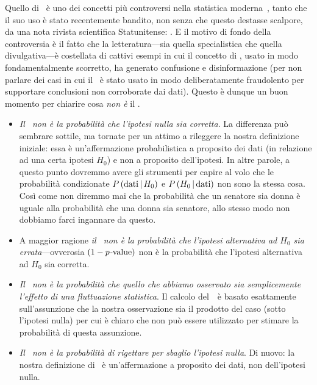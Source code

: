 Quello di \pvalue\ è uno dei concetti più controversi nella statistica
moderna~\cite{dagostini_pvalues,asa_pvalues}, tanto che il suo uso è stato
recentemente bandito, non senza che questo destasse scalpore, da una nota
rivista scientifica Statunitense: .
E il motivo di fondo della controversia è il fatto che la letteratura---sia
quella specialistica che quella divulgativa---è costellata di cattivi esempi
in cui il concetto di \pvalue, usato in modo fondamentalmente scorretto, ha
generato confusione e disinformazione (per non parlare dei casi in cui il
\pvalue\ è stato usato in modo deliberatamente fraudolento per supportare
conclusioni non corroborate dai dati). Questo è dunque un buon momento per
chiarire cosa \emph{non è} il \pvalue.

\begin{itemize}
\item \emph{Il \pvalue\ non è la probabilità che l'ipotesi nulla sia
  corretta}. La differenza può sembrare sottile, ma tornate per un attimo a
  rileggere la nostra definizione iniziale: essa è un'affermazione
  probabilistica a proposito dei dati (in relazione ad una certa ipotesi $H_0$)
  e non a proposito dell'ipotesi. In altre parole, a questo punto dovremmo
  avere gli strumenti per capire al volo che le probabilità condizionate
  $\displaystyle P\left(\text{dati} \,|\, H_0\right)$ e $\displaystyle P\left(H_0 \,|\, \text{dati}\right)$ non sono la
  stessa cosa. Così come non diremmo mai che la probabilità che un senatore
  sia donna è uguale alla probabilità che una donna sia senatore, allo
  stesso modo non dobbiamo farci ingannare da questo.
\item A maggior ragione \emph{il \pvalue\ non è la probabilità che
  l'ipotesi alternativa ad $H_0$ sia errata}---ovverosia $(1 - \text{\emph{$p$-\emph{value}}})$
  non è la probabilità che l'ipotesi alternativa ad $H_0$ sia corretta.
\item \emph{Il \pvalue\ non è la probabilità che quello che abbiamo
  osservato sia semplicemente l'effetto di una fluttuazione statistica}.
  Il calcolo del~\pvalue\ è basato esattamente sull'assunzione che
  la nostra osservazione sia il prodotto del caso (sotto l'ipotesi nulla) per
  cui è chiaro che non può essere utilizzato per stimare la probabilità
  di questa assunzione.
\item \emph{Il \pvalue\ non è la probabilità di rigettare per sbaglio
  l'ipotesi nulla}. Di nuovo: la nostra definizione di \pvalue\ è
  un'affermazione a proposito dei dati, non dell'ipotesi nulla.
\end{itemize}

